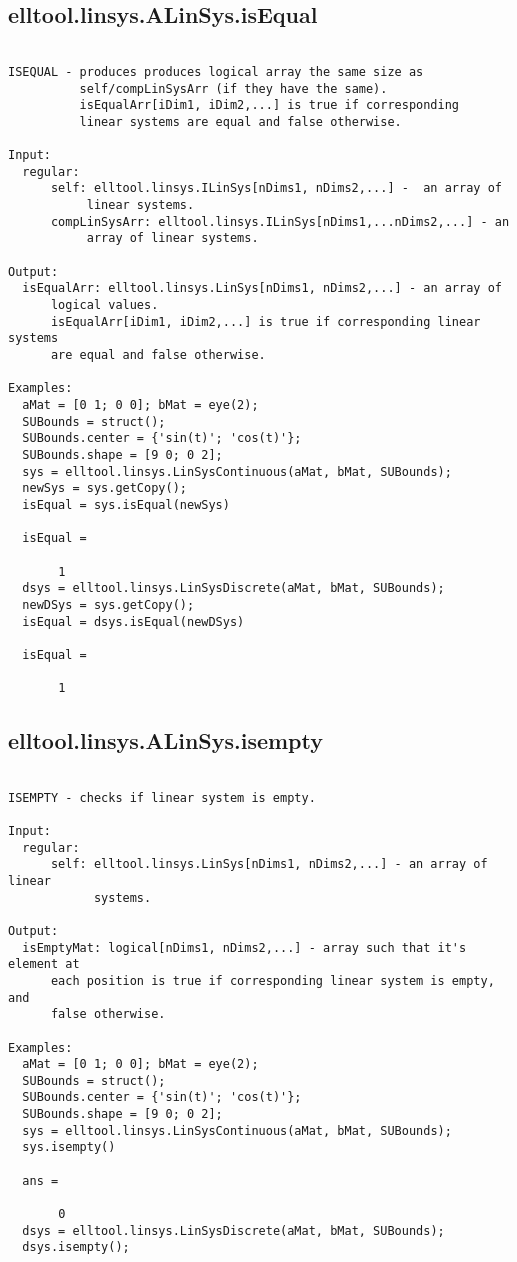 \subsection{\texorpdfstring{elltool.linsys.ALinSys.isEqual}{isEqual}}\label{method:elltool.linsys.ALinSys.isEqual}
\begin{verbatim}

ISEQUAL - produces produces logical array the same size as
          self/compLinSysArr (if they have the same).
          isEqualArr[iDim1, iDim2,...] is true if corresponding
          linear systems are equal and false otherwise.

Input:
  regular:
      self: elltool.linsys.ILinSys[nDims1, nDims2,...] -  an array of
           linear systems.
      compLinSysArr: elltool.linsys.ILinSys[nDims1,...nDims2,...] - an
           array of linear systems.

Output:
  isEqualArr: elltool.linsys.LinSys[nDims1, nDims2,...] - an array of
      logical values.
      isEqualArr[iDim1, iDim2,...] is true if corresponding linear systems
      are equal and false otherwise.

Examples:
  aMat = [0 1; 0 0]; bMat = eye(2);
  SUBounds = struct();
  SUBounds.center = {'sin(t)'; 'cos(t)'};
  SUBounds.shape = [9 0; 0 2];
  sys = elltool.linsys.LinSysContinuous(aMat, bMat, SUBounds);
  newSys = sys.getCopy();
  isEqual = sys.isEqual(newSys)

  isEqual =

       1
  dsys = elltool.linsys.LinSysDiscrete(aMat, bMat, SUBounds);
  newDSys = sys.getCopy();
  isEqual = dsys.isEqual(newDSys)

  isEqual =

       1
\end{verbatim}
\subsection{\texorpdfstring{elltool.linsys.ALinSys.isempty}{isempty}}\label{method:elltool.linsys.ALinSys.isempty}
\begin{verbatim}

ISEMPTY - checks if linear system is empty.

Input:
  regular:
      self: elltool.linsys.LinSys[nDims1, nDims2,...] - an array of linear
            systems.

Output:
  isEmptyMat: logical[nDims1, nDims2,...] - array such that it's element at
      each position is true if corresponding linear system is empty, and
      false otherwise.

Examples:
  aMat = [0 1; 0 0]; bMat = eye(2);
  SUBounds = struct();
  SUBounds.center = {'sin(t)'; 'cos(t)'};
  SUBounds.shape = [9 0; 0 2];
  sys = elltool.linsys.LinSysContinuous(aMat, bMat, SUBounds);
  sys.isempty()

  ans =

       0
  dsys = elltool.linsys.LinSysDiscrete(aMat, bMat, SUBounds);
  dsys.isempty();
\end{verbatim}
